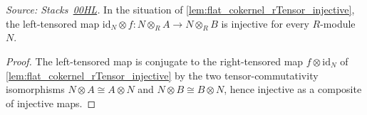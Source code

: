 \begin{lemma}\leanok
  \label{lem:flat_cokernel_lTensor_injective}
  \textit{Source: Stacks~\href{https://stacks.math.columbia.edu/tag/00HL}{00HL}.}
  In the situation of \cref{lem:flat_cokernel_rTensor_injective}, the
  left-tensored map \(\mathrm{id}_N \otimes f : N \otimes_R A \to N \otimes_R
  B\) is injective for every \(R\)-module \(N\).
\end{lemma}
\begin{proof}\leanok
  The left-tensored map is conjugate to the right-tensored map
  \(f \otimes \mathrm{id}_N\) of \cref{lem:flat_cokernel_rTensor_injective} by
  the two tensor-commutativity isomorphisms \(N \otimes A \cong A \otimes N\)
  and \(N \otimes B \cong B \otimes N\), hence injective as a composite of
  injective maps.
\end{proof}

